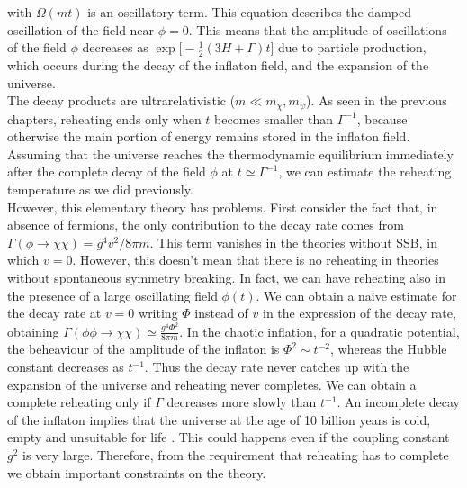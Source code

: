 \documentclass[11pt,a4paper,twoside]{book}
\begin{document}
with $ \Omega(mt) $ is an oscillatory term. This equation describes the damped oscillation of the field near $ \phi=0 $. This means that the amplitude of oscillations of the field $\phi$ decreases as $ \exp\Big[-\frac{1}{2}(3H+\Gamma)t\Big] $ due to particle production, which occurs during the decay of the inflaton field, and the expansion of the universe.\\
The decay products are ultrarelativistic ($ m \ll m_{\chi},m_{\psi} $). As seen in the previous chapters, reheating ends only when $ t $ becomes smaller than $\Gamma^{-1}$, because otherwise the main portion of energy remains stored in the inflaton field. Assuming that the universe reaches the thermodynamic equilibrium immediately after the complete decay of the field $ \phi $ at $ t \simeq \Gamma^{-1} $, we can estimate the reheating temperature as we did previously. \\
However, this elementary theory has problems. First consider the fact that, in absence of fermions, the only contribution to the decay rate comes from $\Gamma(\phi \rightarrow \chi \chi) = g^{4}v^{2}/8\pi m $. This term vanishes in the theories without SSB, in which $ v=0 $. However, this doesn't mean that there is no reheating in theories without spontaneous symmetry breaking. In fact, we can have reheating also in the presence of a large oscillating field $\phi(t)$. We can obtain a naive estimate for the decay rate at $ v=0 $ writing $\Phi$ instead of $ v $ in the expression of the decay rate, obtaining $ \Gamma(\phi \phi \rightarrow \chi\chi) \simeq \frac{g^{4}\Phi^{2}}{8\pi m} $. In the chaotic inflation, for a quadratic potential, the beheaviour of the amplitude of the inflaton is $ \Phi^{2}\sim t^{-2} $, whereas the Hubble constant decreases as $ t^{-1} $. Thus the decay rate never catches up with the expansion of the universe and reheating never completes. We can obtain a complete reheating only if $\Gamma$ decreases more slowly than $ t^{-1} $. An incomplete decay of the inflaton implies that the universe at the age of 10 billion years is cold, empty and unsuitable for life \cite{Chap4:LindePreheatingModel}. This could happens even if the coupling constant $ g^{2} $ is very large. Therefore, from the requirement that reheating has to complete we obtain important constraints on the theory.\\
\end{document}
